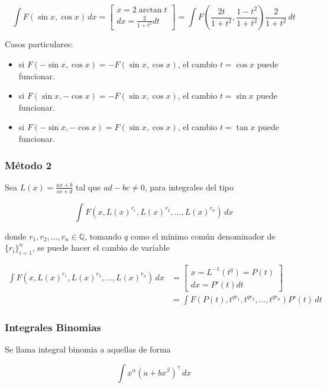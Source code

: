 \[\int F(\sin{x}, \cos{x})\,dx = 
\begin{bmatrix}
x = 2\arctan{t}\\
dx=\frac{2}{1+t^2}dt
\end{bmatrix}
= \int F\left(\frac{2t}{1+t^2},\frac{1-t^2}{1+t^2}\right)
\frac{2}{1+t^2}\,dt\]

Casos particulares:

\begin{itemize}
    \item si $F(-\sin{x}, \cos{x}) = -F(\sin{x}, \cos{x})$, el cambio $t = \cos{x}$ puede funcionar.
    \item si $F(\sin{x}, -\cos{x}) = -F(\sin{x}, \cos{x})$, el cambio $t = \sin{x}$ puede funcionar.
    \item si $F(-\sin{x}, -\cos{x}) = F(\sin{x}, \cos{x})$, el cambio $t = \tan{x}$ puede funcionar.
\end{itemize}

\subsubsection{Método 2}%

Sea $L(x) = \frac{ax+b}{cx+d}$ tal que $ad-bc\neq 0$, para integrales del tipo

\[\int F(x, L(x)^{r_1}, L(x)^{r_2}, ..., L(x)^{r_n})\,dx\]

donde $r_1, r_2, ..., r_n \in \mathbb{Q}$, tomando $q$ como el mínimo común denominador de $\{r_i\}_{i=1}^n$, se puede hacer el cambio de variable

\begin{equation}
\begin{split}
\int F(x, L(x)^{r_1}, L(x)^{r_2}, ..., L(x)^{r_n})\,dx & =
\begin{bmatrix}
x = L^{-1}(t^q) = P(t)\\
dx=P'(t)dt
\end{bmatrix}\\ & =
\int F(P(t), t^{qr_1}, t^{qr_2}, ..., t^{qr_n})P'(t)\,dt
\end{split}
\nonumber
\end{equation}

\subsubsection{Integrales Binomias}

Se llama integral binomia a aquellas de forma

\[\int x^\alpha(a+bx^\beta)^\gamma\,dx\]

